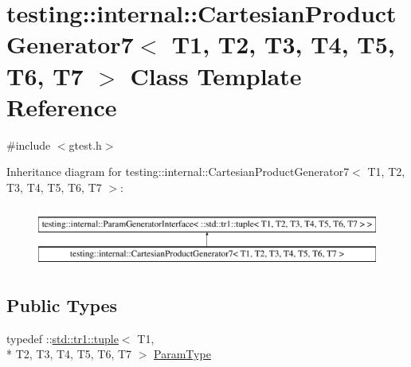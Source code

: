 \hypertarget{classtesting_1_1internal_1_1_cartesian_product_generator7}{\section{testing\-:\-:internal\-:\-:Cartesian\-Product\-Generator7$<$ T1, T2, T3, T4, T5, T6, T7 $>$ Class Template Reference}
\label{classtesting_1_1internal_1_1_cartesian_product_generator7}
}


{\ttfamily \#include $<$gtest.\-h$>$}

Inheritance diagram for testing\-:\-:internal\-:\-:Cartesian\-Product\-Generator7$<$ T1, T2, T3, T4, T5, T6, T7 $>$\-:\begin{figure}[H]
\begin{center}
\leavevmode
\includegraphics[height=2.000000cm]{classtesting_1_1internal_1_1_cartesian_product_generator7}
\end{center}
\end{figure}
\subsection*{Public Types}
\begin{DoxyCompactItemize}
\item 
typedef \-::\hyperlink{classstd_1_1tr1_1_1tuple}{std\-::tr1\-::tuple}$<$ T1, \\*
T2, T3, T4, T5, T6, T7 $>$ \hyperlink{classtesting_1_1internal_1_1_cartesian_product_generator7_ac749b651dcf74699c59f548cd33e40c1}{Param\-Type}
\end{DoxyCompactItemize}
